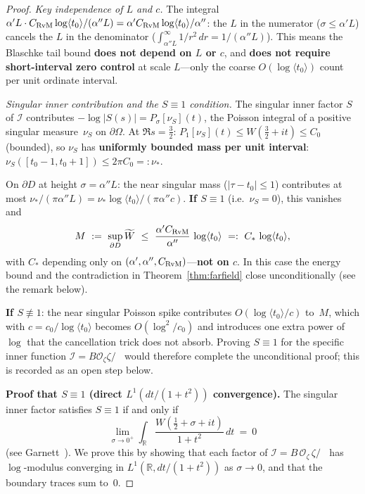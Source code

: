 \documentclass[11pt]{amsart}
\theoremstyle{definition}
\theoremstyle{remark}
\DeclareMathOperator{\dettwo}{det_2}
\newcommand{\angles}[1]{\langle #1\rangle}
\begin{document}
{\begin{proof}
\emph{Key independence of \(L\) and \(c\).}
The integral
\(\alpha'L\cdot C_{\rm RvM}\log\angles{t_0}/(\alpha''L)=\alpha'C_{\rm RvM}\log\angles{t_0}/\alpha''\):
the \(L\) in the numerator (\(\sigma\le\alpha'L\)) cancels the \(L\) in the denominator
(\(\int_{\alpha''L}^\infty 1/r^2\,dr=1/(\alpha''L)\)).
This means the Blaschke tail bound \textbf{does not depend on \(L\) or \(c\)},
and \textbf{does not require short-interval zero control} at scale \(L\)---only
the coarse \(O(\log\angles{t_0})\) count per unit ordinate interval.

\emph{Singular inner contribution and the $S\equiv 1$ condition.}
The singular inner factor \(S\) of \(\mathcal I\) contributes
\(-\log|S(s)|=P_\sigma[\nu_S](t)\), the Poisson integral of a positive singular
measure~\(\nu_S\) on \(\partial\Omega\).
At \(\Re s=\tfrac32\): \(P_1[\nu_S](t)\le W(\tfrac32+it)\le C_0\) (bounded),
so \(\nu_S\) has \textbf{uniformly bounded mass per unit interval}:
\(\nu_S([t_0-1,t_0+1])\le 2\pi C_0=:\nu_*\).

On \(\partial D\) at height \(\sigma=\alpha''L\):
the near singular mass (\(|\tau-t_0|\le 1\)) contributes at most
\(\nu_*/(\pi\alpha''L)=\nu_*\log\angles{t_0}/(\pi\alpha''c)\).
\textbf{If \(S\equiv 1\)} (i.e.\ \(\nu_S=0\)), this vanishes and
\[
  M\ :=\ \sup_{\partial D}\widetilde W\ \le\ \frac{\alpha'C_{\rm RvM}}{\alpha''}\,\log\angles{t_0}
  \ =:\ C_*\,\log\angles{t_0},
\]
with \(C_*\) depending only on \((\alpha',\alpha'',C_{\rm RvM})\)---\textbf{not on \(c\)}.
In this case the energy bound and the contradiction in Theorem~\ref{thm:farfield}
close unconditionally (see the remark below).

\textbf{If \(S\not\equiv 1\)}: the near singular Poisson spike contributes
\(O(\log\angles{t_0}/c)\) to~\(M\), which with \(c=c_0/\log\angles{t_0}\)
becomes \(O(\log^2\!/c_0)\) and introduces one extra power of \(\log\)
that the cancellation trick does not absorb.
Proving \(S\equiv 1\) for the specific inner function
\(\mathcal I=B\mathcal O_\zeta\zeta/\dettwo\)
would therefore complete the unconditional proof;
this is recorded as an open step below.

\medskip\noindent\textbf{Proof that $S\equiv 1$
(direct $L^1(dt/(1+t^2))$ convergence).}
The singular inner factor satisfies \(S\equiv 1\) if and only if
\[
  \lim_{\sigma\to 0^+}\int_{\mathbb R}\frac{W(\tfrac12+\sigma+it)}{1+t^2}\,dt\ =\ 0
\]
(see Garnett~\cite[Ch.~II]{GarnettBAF}).
We prove this by showing that each factor of
\(\mathcal I=B\,\mathcal O_\zeta\,\zeta/\dettwo\)
has \(\log\)-modulus converging in \(L^1(\mathbb R,dt/(1+t^2))\) as \(\sigma\to 0\),
and that the boundary traces sum to~\(0\).


\end{proof}}
\end{document}
